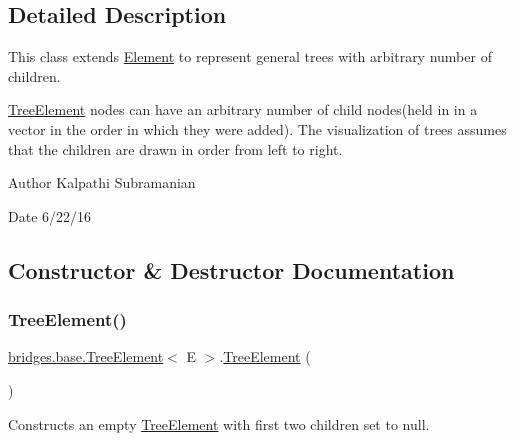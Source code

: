 \subsection{Detailed Description}
This class extends \hyperlink{classbridges_1_1base_1_1_element}{Element} to represent general trees with arbitrary number of children. 

\hyperlink{classbridges_1_1base_1_1_tree_element}{Tree\+Element} nodes can have an arbitrary number of child nodes(held in in a vector in the order in which they were added). The visualization of trees assumes that the children are drawn in order from left to right.

\begin{DoxyAuthor}{Author}
Kalpathi Subramanian 
\end{DoxyAuthor}
\begin{DoxyDate}{Date}
6/22/16 
\end{DoxyDate}


\subsection{Constructor \& Destructor Documentation}
\hypertarget{classbridges_1_1base_1_1_tree_element_ab1af682e9304f5427e308ba5f43d7a9a}{}\label{classbridges_1_1base_1_1_tree_element_ab1af682e9304f5427e308ba5f43d7a9a} 
\subsubsection{\texorpdfstring{Tree\+Element()}{TreeElement()}\hspace{0.1cm}{\footnotesize\ttfamily [1/5]}}
{\footnotesize\ttfamily \hyperlink{classbridges_1_1base_1_1_tree_element}{bridges.\+base.\+Tree\+Element}$<$ E $>$.\hyperlink{classbridges_1_1base_1_1_tree_element}{Tree\+Element} (\begin{DoxyParamCaption}{ }\end{DoxyParamCaption})}

Constructs an empty \hyperlink{classbridges_1_1base_1_1_tree_element}{Tree\+Element} with first two children set to null. \hypertarget{classbridges_1_1base_1_1_tree_element_a0f17c278536239fb6cba051246ef67a8}{}\label{classbridges_1_1base_1_1_tree_element_a0f17c278536239fb6cba051246ef67a8} 
